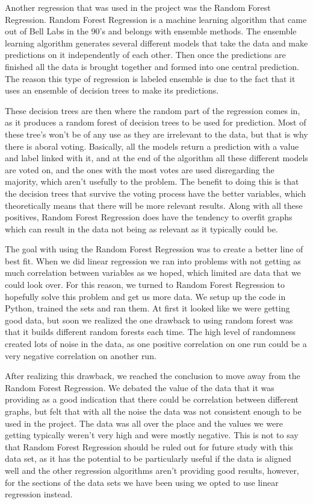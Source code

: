 \documentclass[12pt]{report}
\begin{document}
\par Another regression that was used in the project was the Random Forest Regression. Random Forest Regression is a machine learning algorithm that came out of Bell Labs in the 90’s and belongs with ensemble methods. The ensemble learning algorithm generates several different models that take the data and make predictions on it independently of each other. Then once the predictions are finished all the data is brought together and formed into one central prediction. The reason this type of regression is labeled ensemble is due to the fact that it uses an ensemble of decision trees to make its predictions.
\par These decision trees are then where the random part of the regression comes in, as it produces a random forest of decision trees to be used for prediction. Most of these tree’s won't be of any use as they are irrelevant to the data, but that is why there is aboral voting. Basically, all the models return a prediction with a value and label linked with it, and at the end of the algorithm all these different models are voted on, and the ones with the most votes are used disregarding the majority, which aren’t usefully to the problem. The benefit to doing this is that the decision trees that survive the voting process have the better variables, which theoretically means that there will be more relevant results. Along with all these positives, Random Forest Regression does have the tendency to overfit graphs which can result in the data not being as relevant as it typically could be. 
\par The goal with using the Random Forest Regression was to create a better line of best fit. When we did linear regression we ran into problems with not getting as much correlation between variables as we hoped, which limited are data that we could look over. For this reason, we turned to Random Forest Regression to hopefully solve this problem and get us more data. We setup up the code in Python, trained the sets and ran them. At first it looked like we were getting good data, but soon we realized the one drawback to using random forest was that it builds different random forests each time. The high level of randomness created lots of noise in the data, as one positive correlation on one run could be a very negative correlation on another run.
\par After realizing this drawback, we reached the conclusion to move away from the Random Forest Regression. We debated the value of the data that it was providing as a good indication that there could be correlation between different graphs, but felt that with all the noise the data was not consistent enough to be used in the project. The data was all over the place and the values we were getting typically weren’t very high and were mostly negative. This is not to say that Random Forest Regression should be ruled out for future study with this data set, as it has the potential to be particularly useful if the data is aligned well and the other regression algorithms aren’t providing good results, however, for the sections of the data sets we have been using we opted to use linear regression instead. 
\end{document}
